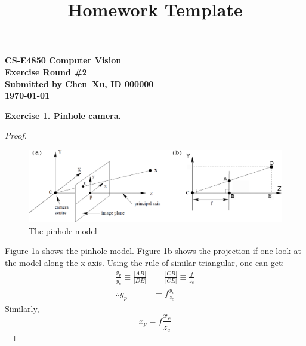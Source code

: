 \documentclass[letterpaper, 11pt]{article}
\begin{document}
\title{Homework Template}

\begin{center}
    {
        \large
        \bf
        CS-E4850 Computer Vision\\
        Exercise Round \#2\\
        Submitted by Chen\ Xu, ID 000000\\
        \today
    }
\end{center}

\bigskip

\textbf{Exercise 1. Pinhole camera.}\\

\begin{proof}

    \begin{figure}[!ht]
        \centering
        \includegraphics[width=1\textwidth]{pinhole.png}
        \caption{The pinhole model}
        \label{fig:pinhole}
    \end{figure}

    Figure \ref{fig:pinhole}a shows the pinhole model. Figure \ref{fig:pinhole}b shows the projection if one look at the model along the x-axis. Using the rule of similar triangular, one can get:
    \begin{align*}
        \frac{y_p}{y_c}\equiv\frac{|AB|}{|DE|} & = \frac{|CB|}{|CE|}\equiv\frac{f}{z_c} \\
        \therefore y_p                         & = f\frac{y_c}{z_c}
    \end{align*}
    Similarly,
    $$
        x_p = f\frac{x_c}{z_c}
    $$
\end{proof}
\end{document}
